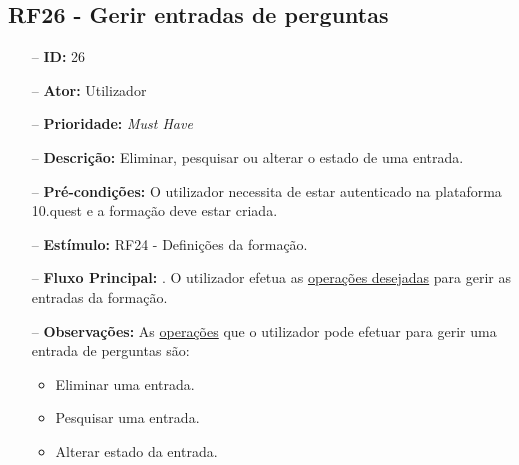 \subsection{RF26 - Gerir entradas de perguntas}
\begin{itemize}
	\item[--] \textbf{ID:} 26
	\item[--]  \textbf{Ator:} Utilizador
	\item[--]  \textbf{Prioridade:} \textit{Must Have}
	\item[--]  \textbf{Descrição:} Eliminar, pesquisar ou alterar o estado de uma entrada.
	\item[--]  \textbf{Pré-condições:} O utilizador necessita de estar autenticado na plataforma 10.quest e a formação deve estar criada.
	\item[--]  \textbf{Estímulo:} RF24 - Definições da formação.
	\item[--]  \textbf{Fluxo Principal:} 
		. O utilizador efetua as \underline{operações desejadas} para gerir as entradas da formação.
	\begin{comment}
	\item[--]  \textbf{Fluxo de Excepção:} 
	\subitem 1a. O 10.quest não consegue efetuar o pedido à API do TCG devido a uma falha na conexão.
	\subitem 1a1. O 10.quest notifica o utilizador que ocorreu uma falha na conexão.
	\subitem 1b. O serviço do TCG (API) está indisponível.
	\subitem 1b1. O 10.quest notifica o utilizador que o serviço do TCG está temporariamente indisponível. 
	\end{comment}
	\item[--]  \textbf{Observações:} As \underline{operações} que o utilizador pode efetuar para gerir uma entrada de perguntas são:
	\begin{itemize}
		\item Eliminar uma entrada.
		\item Pesquisar uma entrada.
		\item Alterar estado da entrada.
	\end{itemize}
\end{itemize}
\newpage


